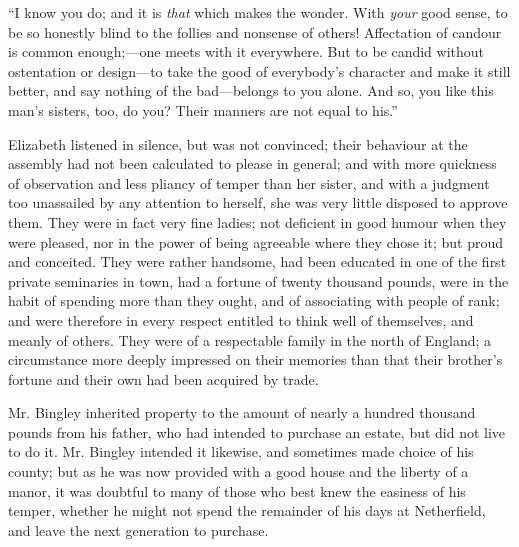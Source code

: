 


“I know you do; and it is {\em that} which makes the wonder. With {\em your} good sense, to be so honestly blind to the follies and nonsense of others! Affectation of candour is common enough;---one meets with it everywhere. But to be candid without ostentation or design---to take the good of everybody's character and make it still better, and say nothing of the bad---belongs to you alone. And so, you like this man's sisters, too, do you? Their manners are not equal to his.”


Elizabeth listened in silence, but was not convinced; their behaviour at the assembly had not been calculated to please in general; and with more quickness of observation and less pliancy of temper than her sister, and with a judgment too unassailed by any attention to herself, she was very little disposed to approve them. They were in fact very fine ladies; not deficient in good humour when they were pleased, nor in the power of being agreeable where they chose it; but proud and conceited. They were rather handsome, had been educated in one of the first private seminaries in town, had a fortune of twenty thousand pounds, were in the habit of spending more than they ought, and of associating with people of rank; and were therefore in every respect entitled to think well of themselves, and meanly of others. They were of a respectable family in the north of England; a circumstance more deeply impressed on their memories than that their brother's fortune and their own had been acquired by trade.

Mr. Bingley inherited property to the amount of nearly a hundred thousand pounds from his father, who had intended to purchase an estate, but did not live to do it. Mr. Bingley intended it likewise, and sometimes made choice of his county; but as he was now provided with a good house and the liberty of a manor, it was doubtful to many of those who best knew the easiness of his temper, whether he might not spend the remainder of his days at Netherfield, and leave the next generation to purchase.

